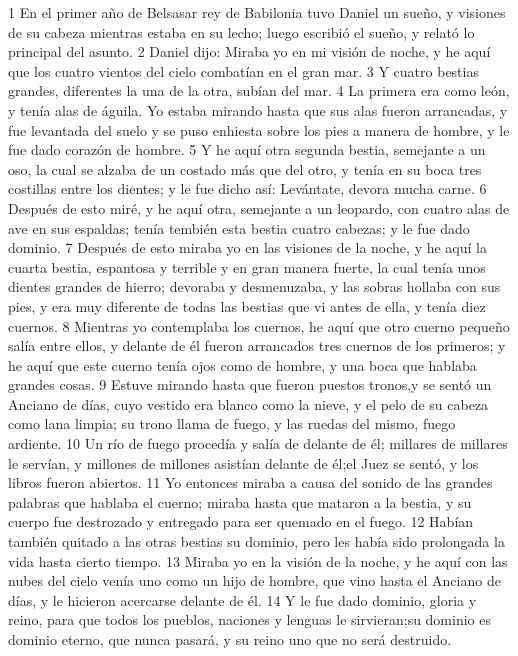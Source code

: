 1 En el primer año de Belsasar rey de Babilonia tuvo Daniel un sueño, y visiones de su cabeza mientras estaba en su lecho; luego escribió el sueño, y relató lo principal del asunto.
2 Daniel dijo: Miraba yo en mi visión de noche, y he aquí que los cuatro vientos del cielo combatían en el gran mar.
3 Y cuatro bestias grandes, diferentes la una de la otra, subían del mar. 
4 La primera era como león, y tenía alas de águila. Yo estaba mirando hasta que sus alas fueron arrancadas, y fue levantada del suelo y se puso enhiesta sobre los pies a manera de hombre, y le fue dado corazón de hombre.
5 Y he aquí otra segunda bestia, semejante a un oso, la cual se alzaba de un costado más que del otro, y tenía en su boca tres costillas entre los dientes; y le fue dicho así: Levántate, devora mucha carne.
6 Después de esto miré, y he aquí otra, semejante a un leopardo, con cuatro alas de ave en sus espaldas; tenía tembién esta bestia cuatro cabezas; y le fue dado dominio. 
7 Después de esto miraba yo en las visiones de la noche, y he aquí la cuarta bestia, espantosa y terrible y en gran manera fuerte, la cual tenía unos dientes grandes de hierro; devoraba y desmenuzaba, y las sobras hollaba con sus pies, y era muy diferente de todas las bestias que vi antes de ella, y tenía diez cuernos. 
8 Mientras yo contemplaba los cuernos, he aquí que otro cuerno pequeño salía entre ellos, y delante de él fueron arrancados tres cuernos de los primeros; y he aquí que este cuerno tenía ojos como de hombre, y una boca que hablaba grandes cosas. 
9 Estuve mirando hasta que fueron puestos tronos,y se sentó un Anciano de días, cuyo vestido era blanco como la nieve, y el pelo de su cabeza como lana limpia; su trono llama de fuego, y las ruedas del mismo, fuego ardiente.
10 Un río de fuego procedía y salía de delante de él; millares de millares le servían, y millones de millones asistían delante de él;el Juez se sentó, y los libros fueron abiertos. 
11 Yo entonces miraba a causa del sonido de las grandes palabras que hablaba el cuerno; miraba hasta que mataron a la bestia, y su cuerpo fue destrozado y entregado para ser quemado en el fuego.
12 Habían también quitado a las otras bestias su dominio, pero les había sido prolongada la vida hasta cierto tiempo.
13 Miraba yo en la visión de la noche, y he aquí con las nubes del cielo venía uno como un hijo de hombre, que vino hasta el Anciano de días, y le hicieron acercarse delante de él.
14 Y le fue dado dominio, gloria y reino, para que todos los pueblos, naciones y lenguas le sirvieran;su dominio es dominio eterno, que nunca pasará, y su reino uno que no será destruido.
